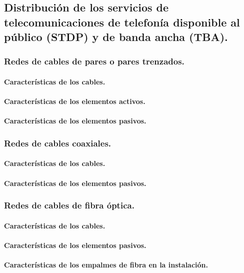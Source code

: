 \subsection{Distribución de los servicios de telecomunicaciones de telefonía disponible al público (STDP) y de banda ancha (TBA).}
\subsubsection{Redes de cables de pares o pares trenzados.}
\paragraph{Características de los cables.}
\paragraph{Características de los elementos activos.}
\paragraph{Características de los elementos pasivos.}
\subsubsection{Redes de cables coaxiales.}
\paragraph{Características de los cables.}
\paragraph{Características de los elementos pasivos.}
\subsubsection{Redes de cables de fibra óptica.}
\paragraph{Características de los cables.}
\paragraph{Características de los elementos pasivos.}
\paragraph{Características de los empalmes de fibra en la instalación.}